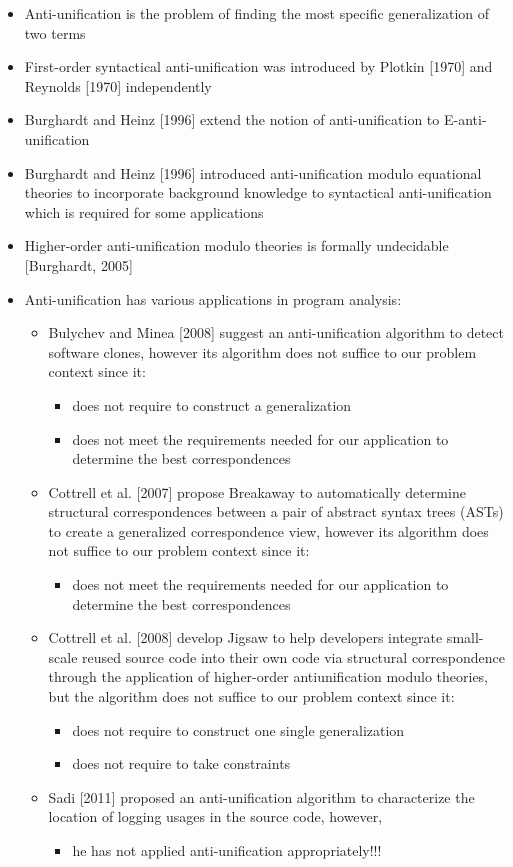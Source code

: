 \documentclass{article}
\begin{document}
\begin{itemize} [leftmargin=.1in]
\item Anti-unification is the problem of finding the most specific generalization of two terms
\item First-order syntactical anti-unification was introduced by Plotkin [1970] and Reynolds [1970] independently
\item Burghardt and Heinz [1996] extend the notion of anti-unification to E-anti-unification
\item Burghardt and Heinz [1996] introduced anti-unification
modulo equational theories to incorporate background knowledge to syntactical anti-unification which is required for some applications
\item Higher-order anti-unification modulo theories is formally undecidable [Burghardt, 2005]
\item Anti-unification has various applications in program analysis:
\begin{itemize}
\item Bulychev and Minea [2008] suggest an anti-unification algorithm to detect software clones, however its algorithm does not suffice to our problem context since it:
\begin{itemize}
\item does not require to construct a generalization
\item does not meet the requirements needed for our application to determine the best correspondences
\end{itemize}
\item Cottrell et al. [2007] propose Breakaway to automatically determine structural correspondences between a pair of abstract syntax trees (ASTs) to create a generalized correspondence view, however its algorithm does not suffice to our problem context since it:
\begin{itemize}
\item does not meet the requirements needed for our application to determine the best correspondences
\end{itemize}

\item Cottrell et al. [2008] develop Jigsaw to help developers integrate small-scale reused source code into their own code via structural correspondence through the application of higher-order antiunification modulo theories, but the algorithm does not suffice to our problem context since it:
\begin{itemize}
\item does not require to construct one single generalization
\item does not require to take constraints
\end{itemize}
\item Sadi [2011] proposed an anti-unification algorithm to characterize the location of logging usages in the source code, however,
\begin{itemize}
\item he has not applied anti-unification appropriately!!! 
\end{itemize}


\end{itemize}
\end{itemize}
\end{document}
